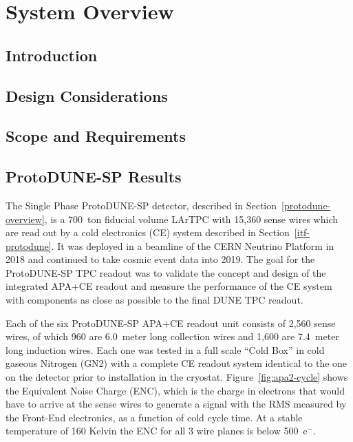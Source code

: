 \section{System Overview}
\label{sec:fdsp-tpcelec-overview}

\subsection{Introduction}
\label{sec:fdsp-tpcelec-overview-intro}

\subsection{Design Considerations}
\label{sec:fdsp-tpcelec-overview-design}

\subsection{Scope and Requirements}
\label{sec:fdsp-tpcelec-overview-scope}

\subsection{ProtoDUNE-SP Results}
\label{sec:fdsp-tpcelec-overview-pdune}

The Single Phase ProtoDUNE-SP detector, described in Section~\ref{protodune-overview}, is a 700~ton fiducial volume LArTPC with 15,360 sense wires which are read out by a cold electronics (CE) system described in Section~\ref{itf-protodune}. It was deployed in a beamline of the CERN Neutrino Platform in 2018 and continued to take cosmic event data into 2019. The goal for the ProtoDUNE-SP TPC readout was to validate the concept and design of the integrated APA+CE readout and measure the performance of the CE system with components as close as possible to the final DUNE TPC readout.

Each of the six ProtoDUNE-SP APA+CE readout unit consists of 2,560 sense wires, of which 960 are 6.0~meter long collection wires and 1,600 are 7.4~meter long induction wires. Each one was tested in a full scale ``Cold Box'' in cold gaseous Nitrogen (GN2) with a complete CE readout system identical to the one on the detector prior to installation in the cryostat. Figure~\ref{fig:apa2-cycle} shows the Equivalent Noise Charge (ENC), which is the charge in electrons that would have to arrive at the sense wires to generate a signal with the RMS measured by the Front-End electronics, as a function of cold cycle time. At a stable temperature of 160 Kelvin the ENC for all 3 wire planes is below 500~e$^-$.

